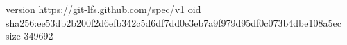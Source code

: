 version https://git-lfs.github.com/spec/v1
oid sha256:ee53db2b200f2d6efb342c5d6df7dd0e3eb7a9f979d95df0c073b4dbe108a5ec
size 349692
